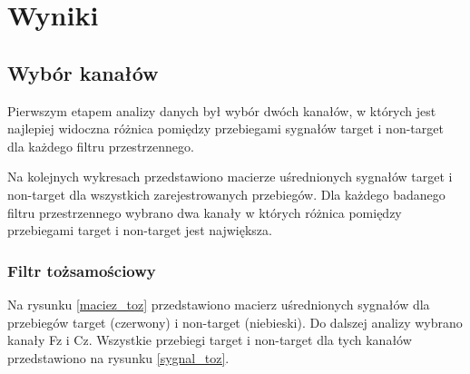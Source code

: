 \documentclass[licencjacka,openright]{pracamgr}
\begin{document}
\chapter{Wyniki}
\label{wyniki}



\section{Wybór kanałów}
\label{sygnaly}

Pierwszym etapem analizy danych był wybór dwóch kanałów, w których jest najlepiej widoczna różnica pomiędzy przebiegami sygnałów target i non-target dla każdego filtru przestrzennego. 

Na kolejnych wykresach przedstawiono macierze uśrednionych sygnałów target i non-target dla wszystkich zarejestrowanych przebiegów. Dla każdego badanego filtru przestrzennego wybrano dwa kanały w których różnica pomiędzy przebiegami target i non-target jest największa.


\subsection{Filtr tożsamościowy}

Na rysunku \ref{maciez_toz} przedstawiono macierz uśrednionych sygnałów dla przebiegów target (czerwony) i non-target (niebieski). Do dalszej analizy wybrano kanały Fz i Cz. Wszystkie przebiegi target i non-target dla tych kanałów przedstawiono na rysunku \ref{sygnal_toz}.
\end{document}
